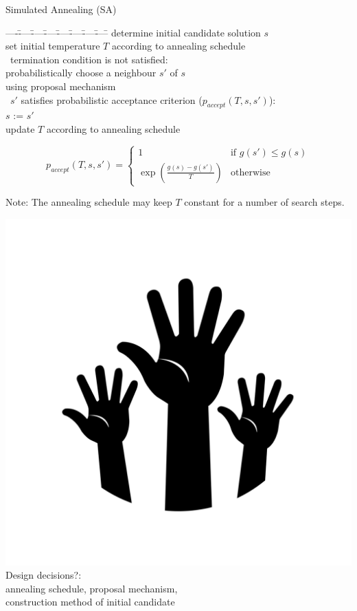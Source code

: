 \begin{frame}[c]{Simulated Annealing (SA)}

\begin{tabbing}
----\=----\=----\=----\=----\=----\=----\=----\=\kill
\> determine initial candidate solution $s$\\
\> set initial temperature $T$ according to annealing schedule\\
\> \pscWhile\ termination condition is not satisfied:\\
\> \vbar \> probabilistically choose a neighbour $s'$ of $s$ \\[-0.55ex]
\> \vbar \> \> using proposal mechanism\\[-0.55ex] 
\> \vbar \> \pscIf\ $s'$ satisfies probabilistic acceptance criterion ($p_{accept}(T,s,s')$):\\[-0.55ex]
\> \vbar \> \> $s$ := $s'$\\[-0.55ex]
\> \vend \> update $T$ according to annealing schedule
\end{tabbing}

\begin{equation}
p_{accept}(T,s,s')= \begin{cases}
					1 & \text{if } g(s') \leq g(s)\\
					\exp\left(\frac{g(s)-g(s')}{T}\right)  & \text{otherwise}
\end{cases}\nonumber
\end{equation}

\pause

Note: The annealing schedule may keep $T$ constant for a number of search steps.

\medskip
\includegraphics[scale=.01]{images/hands.png}
\alert{Design decisions?}:\\
\pause annealing schedule, proposal mechanism,\\ 
construction method of initial candidate

\end{frame}
